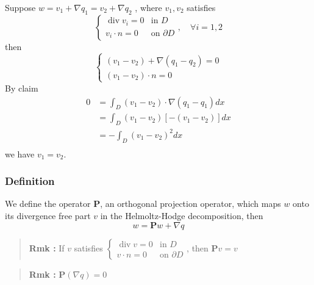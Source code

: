 Suppose $w = v_{1} + \nabla q_1 = v_2 + \nabla q_2$ , where $v_1, v_2$ satisfies
\begin{equation}
\displaystyle \begin{cases}\operatorname{div}v_i=0&\text{in $D$}\\ v_i\cdot n = 0&\text{on $\partial D$}\end{cases},\quad \forall i=1,2
\end{equation}
then
\begin{equation}
\begin{cases}
(v_1 - v_2) + \nabla (q_1 - q_2) = 0\\
\left(v_1 - v_2\right) \cdot n = 0
\end{cases}
\end{equation}
By claim
\begin{equation}
\begin{aligned}
0 &=\int_{D}\left(v_1 - v_2\right) \cdot \nabla\left(q_1 - q_1\right) dx\\
&= \int_{D}\left(v_1 - v_2\right)\left[-\left(v_1 - v_2\right)\right] dx\\
&= -\int_{D}\left(v_1 - v_2\right)^2 dx\\
\end{aligned}
\end{equation}
we have $v_1 = v_2$.

\subsubsection{Definition} %

We define the operator $\mathbf{P}$, an orthogonal projection operator, which maps $w$ onto its divergence free part $v$ in the Helmoltz-Hodge decomposition, then
\begin{equation}
w = \mathbf{P}w + \nabla q
\end{equation}


\begin{quote}
	\textbf{Rmk :}
If $v$ satisfies $\displaystyle \begin{cases}\operatorname{div}v=0&\text{in $D$}\\ v\cdot n = 0&\text{on $\partial D$}\end{cases}$, then $\mathbf{P} v = v$
\end{quote}

\begin{quote}
	\textbf{Rmk :}
$\mathbf{P}(\nabla q) = 0$
\end{quote}

